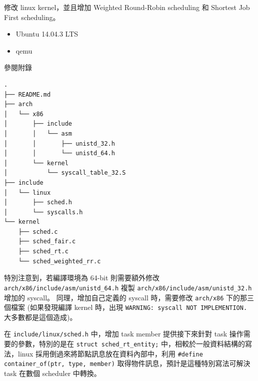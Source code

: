 \documentclass{res}
\begin{document}
 


\address{\\R03922106 蔡佑隆 unzledick@yahoo.com.tw\\ R04922067 楊翔雲 morris821028@gmail.com}

\begin{resume}

\vspace*{.1in} 

修改 linux kernel，並且增加 Weighted Round-Robin scheduling 和 Shortest Job First scheduling。

\vspace*{.1in} 

\begin{itemize}
	\item Ubuntu 14.04.3 LTS
	\item qemu
\end{itemize}


\vspace*{.1in} 

參閱附錄

\vspace*{.1in} 

\begin{lstlisting}[frame=single]
.
├── README.md
├── arch
│   └── x86
│       ├── include
│       │   └── asm
│       │       ├── unistd_32.h
│       │       └── unistd_64.h
│       └── kernel
│           └── syscall_table_32.S
├── include
│   └── linux
│       ├── sched.h
│       └── syscalls.h
└── kernel
    ├── sched.c
    ├── sched_fair.c
    ├── sched_rt.c
    └── sched_weighted_rr.c
\end{lstlisting}

特別注意到，若編譯環境為 64-bit 則需要額外修改 \lstinline{arch/x86/include/asm/unistd_64.h} 複製 \lstinline{arch/x86/include/asm/unistd_32.h} 增加的 syscall。 同理，增加自己定義的 syscall 時，需要修改 \lstinline{arch/x86} 下的那三個檔案 (如果發現編譯 kernel 時，出現 \lstinline{WARNING: syscall NOT IMPLEMENTION.} 大多數都是這個造成)。

在 \lstinline{include/linux/sched.h} 中，增加 task member 提供接下來針對 task 操作需要的參數，特別的是在 \lstinline{struct sched_rt_entity;} 中，相較於一般資料結構的寫法，linux 採用倒過來將節點訊息放在資料內部中，利用 \lstinline{#define container_of(ptr, type, member)} 取得物件訊息，預計是這種特別寫法可解決 task 在數個 scheduler 中轉換。


\end{resume}
\end{document}
